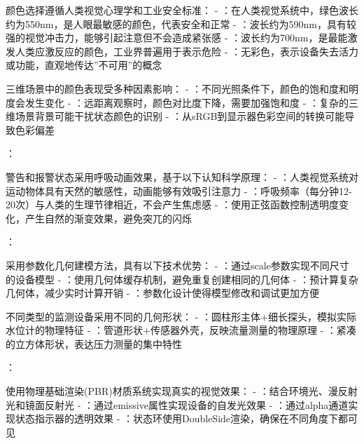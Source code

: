 
颜色选择遵循人类视觉心理学和工业安全标准： - ：在人类视觉系统中，绿色波长约为550nm，是人眼最敏感的颜色，代表安全和正常 - ：波长约为590nm，具有较强的视觉冲击力，能够引起注意但不会造成紧张感 - ：波长约为700nm，是最能激发人类应激反应的颜色，工业界普遍用于表示危险 - ：无彩色，表示设备失去活力或功能，直观地传达''不可用''的概念


三维场景中的颜色表现受多种因素影响： - ：不同光照条件下，颜色的饱和度和明度会发生变化 - ：远距离观察时，颜色对比度下降，需要加强饱和度 - ：复杂的三维场景背景可能干扰状态颜色的识别 - ：从sRGB到显示器色彩空间的转换可能导致色彩偏差

：


警告和报警状态采用呼吸动画效果，基于以下认知科学原理： - ：人类视觉系统对运动物体具有天然的敏感性，动画能够有效吸引注意力 - ：呼吸频率（每分钟12-20次）与人类的生理节律相近，不会产生焦虑感 - ：使用正弦函数控制透明度变化，产生自然的渐变效果，避免突兀的闪烁

：


采用参数化几何建模方法，具有以下技术优势： - ：通过scale参数实现不同尺寸的设备模型 - ：使用几何体缓存机制，避免重复创建相同的几何体 - ：预计算复杂几何体，减少实时计算开销 - ：参数化设计使得模型修改和调试更加方便


不同类型的监测设备采用不同的几何形状： - ：圆柱形主体+细长探头，模拟实际水位计的物理特征 - ：管道形状+传感器外壳，反映流量测量的物理原理 - ：紧凑的立方体形状，表达压力测量的集中特性

：


使用物理基础渲染(PBR)材质系统实现真实的视觉效果： - ：结合环境光、漫反射光和镜面反射光 - ：通过emissive属性实现设备的自发光效果 - ：通过alpha通道实现状态指示器的透明效果 - ：状态环使用DoubleSide渲染，确保在不同角度下都可见

